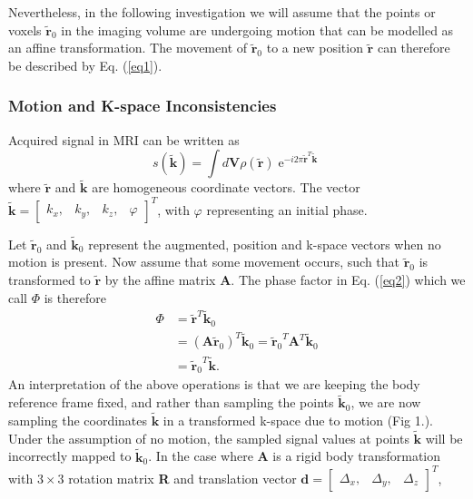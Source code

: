 \documentclass[class=article, crop=false]{standalone}
\begin{document}
\par
Nevertheless, in the following investigation we will assume that the points or voxels $\tilde{\textbf{r}}_0$ in the imaging volume are undergoing motion that can be modelled as an affine transformation. The movement of $\tilde{\textbf{r}}_0$ to a new position $\tilde{\textbf{r}}$ can therefore be described by Eq. (\ref{eq1}).

\subsubsection*{Motion and K-space Inconsistencies}

Acquired signal in MRI can be written as
\begin{equation}
	\label{eq2}
	s(\tilde{\textbf{k}}) = \int d\textbf{V} \rho\left(\tilde{\textbf{r}}\right)\operatorname{e}^{-i2\pi\tilde{\textbf{r}}^{T}\tilde{\textbf{k}}}
\end{equation}
where $\tilde{\textbf{r}}$ and $\tilde{\textbf{k}}$ are homogeneous coordinate vectors. The vector $\tilde{\textbf{k}} = \begin{bmatrix}k_{x},&k_{y},&k_{z},&\varphi\end{bmatrix}^{T}$, with $\varphi$ representing an initial phase.
\par
Let $\tilde{\textbf{r}}_0$ and $\tilde{\textbf{k}}_0$ represent the augmented, position and k-space vectors when no motion is present. Now assume that some movement occurs, such that $\tilde{\textbf{r}}_0$ is transformed to $\tilde{\textbf{r}}$ by the affine matrix \textbf{A}. The phase factor in Eq. (\ref{eq2}) which we call $\Phi$ is therefore
\begin{equation} \label{eq3}
	\begin{split}
		\Phi & = \tilde{\textbf{r}}^T\tilde{\textbf{k}}_0 \\ 
			 & = (\textbf{A}\tilde{\textbf{r}}_0)^T\tilde{\textbf{k}}_0
		     = {\tilde{\textbf{r}}_0}^T\textbf{A}^T\tilde{\textbf{k}}_0 \\
		     & = {\tilde{\textbf{r}}_0}^T\tilde{\textbf{k}}.
	\end{split}
\end{equation}
An interpretation of the above operations is that we are keeping the body reference frame fixed, and rather than sampling the points $\tilde{\textbf{k}}_0$, we are now sampling the coordinates $\tilde{\textbf{k}}$ in a transformed k-space due to motion (Fig 1.). Under the assumption of no motion, the sampled signal values at points $\tilde{\textbf{k}}$ will be incorrectly mapped to $\tilde{\textbf{k}}_0$.  In the case where \textbf{A} is a rigid body transformation with $3\times3$ rotation matrix \textbf{R} and translation vector $\textbf{d} = \begin{bmatrix}\Delta_x,&\Delta_y,&\Delta_z\end{bmatrix}^T$,
\end{document}
